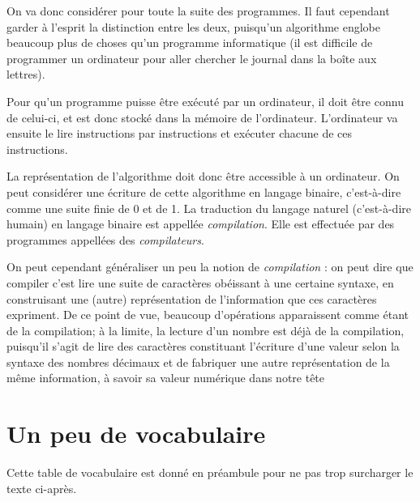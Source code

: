 \documentclass[../../main.tex]{subfiles}
\begin{document}
On va donc considérer pour toute la suite des programmes. Il faut cependant garder à l'esprit la distinction entre les deux, puisqu'un algorithme englobe beaucoup plus de choses qu'un programme informatique (il est difficile de programmer un ordinateur pour aller chercher le journal dans la boîte aux lettres).

Pour qu'un programme puisse être exécuté par un ordinateur, il doit être connu de celui-ci, et est donc stocké dans la mémoire de l'ordinateur. L'ordinateur va ensuite le lire instructions par instructions et exécuter chacune de ces instructions.

La représentation de l'algorithme doit donc être accessible à un ordinateur. On peut considérer une écriture de cette algorithme en langage binaire, c'est-à-dire comme une suite finie de 0 et de 1. La traduction du langage naturel (c'est-à-dire humain) en langage binaire est appellée \textit{compilation}. Elle est effectuée par des programmes appellées des \textit{compilateurs}.

On peut cependant généraliser un peu la notion de \textit{compilation} : on peut dire que compiler c'est lire une suite de caractères obéissant à une certaine syntaxe, en construisant une (autre) représentation de l'information que ces caractères expriment. De ce point
de vue, beaucoup d'opérations apparaissent comme étant de la compilation; à la limite, la lecture d'un nombre est déjà de la compilation, puisqu'il s'agit de lire des caractères constituant l'écriture d'une valeur selon la syntaxe des nombres décimaux et de fabriquer une autre représentation de la même information, à savoir sa valeur numérique \og dans notre tête \fg
\section{Un peu de vocabulaire}
Cette table de vocabulaire est donné en préambule pour ne pas trop surcharger le texte ci-après.


\end{document}
